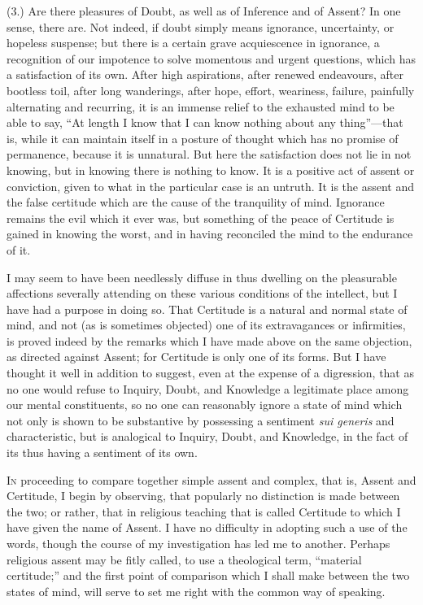 (3.) Are there pleasures of Doubt, as well as of Inference and of
Assent? In one sense, there are. Not indeed, if doubt simply means
ignorance, uncertainty, or hopeless suspense; but there is a certain
grave acquiescence in ignorance, a recognition of our impotence to
solve momentous and urgent questions, which has a satisfaction of its
own. After high aspirations, after renewed endeavours, after bootless
toil, after long wanderings, after hope, effort, weariness, failure,
painfully alternating and recurring, it is an immense relief to the
exhausted mind to be able to say, ``At length I know that I
can know nothing about any thing''—that is, while it can
maintain itself in a posture of thought which has no promise of
permanence, because it is unnatural. But here the satisfaction does
not lie in not knowing, but in knowing there is nothing to know. It is
a positive act of assent or conviction, given to what in the
particular case is an untruth. It is the assent and the false
certitude which are the cause of the tranquility of mind. Ignorance
remains the evil which it ever was, but something of the peace of
Certitude is gained in knowing the worst, and in having reconciled the
mind to the endurance of it.

I may seem to have been needlessly diffuse in thus dwelling on the
pleasurable affections severally attending on these various conditions
of the intellect, but I have had a purpose in doing so. That Certitude
is a natural and normal state of mind, and not (as is sometimes
objected) one of its extravagances or infirmities, is proved indeed by
the remarks which I have made above on the same objection, as directed
against Assent; for Certitude is only one of its forms. But I have
thought it well in addition to suggest, even at the expense of a
digression, that as no one would refuse to Inquiry, Doubt, and
Knowledge a legitimate place among our mental constituents, so no one
can reasonably ignore a state of mind which not only is shown to be
substantive by possessing a sentiment \emph{sui generis} and
characteristic, but is analogical to Inquiry, Doubt, and Knowledge, in
the fact of its thus having a sentiment of its own.



I\textsc{n} proceeding to compare together simple assent and complex,
that is, Assent and Certitude, I begin by observing, that popularly no
distinction is made between the two; or rather, that in religious
teaching that is called Certitude to which I have given the name of
Assent. I have no difficulty in adopting such a use of the words,
though the course of my investigation has led me to another. Perhaps
religious assent may be fitly called, to use a theological term,
``material certitude;'' and the first point of comparison
which I shall make between the two states of mind, will serve to set
me right with the common way of speaking.


